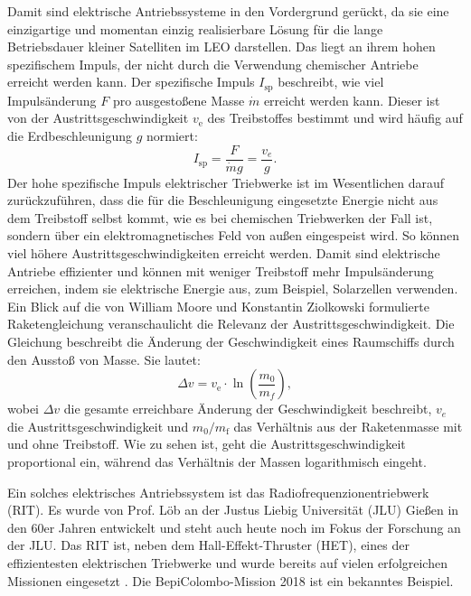 Damit sind elektrische Antriebssysteme in den Vordergrund gerückt, da sie eine einzigartige und momentan einzig realisierbare Lösung für die lange Betriebsdauer kleiner Satelliten im LEO darstellen. Das liegt an ihrem hohen spezifischem Impuls, der nicht durch die Verwendung chemischer Antriebe erreicht werden kann. Der spezifische Impuls $I_{\text{sp}}$ beschreibt, wie viel Impulsänderung $F$ pro ausgestoßene Masse $\dot{m}$ erreicht werden kann. Dieser ist von der Austrittsgeschwindigkeit $v_\text{e}$ des Treibstoffes bestimmt und wird häufig auf die Erdbeschleunigung $g$ normiert:
\begin{equation}
    I_{\text{sp}} = \frac{F}{\dot{m}g} = \frac{v_e}{g}.
\end{equation} 
Der hohe spezifische Impuls elektrischer Triebwerke ist im Wesentlichen darauf zurückzuführen, dass die für die Beschleunigung eingesetzte Energie nicht aus dem Treibstoff selbst kommt, wie es bei chemischen Triebwerken der Fall ist, sondern über ein elektromagnetisches Feld von außen eingespeist wird. So können viel höhere Austrittsgeschwindigkeiten erreicht werden. Damit sind elektrische Antriebe effizienter und können mit weniger Treibstoff mehr Impulsänderung erreichen, indem sie elektrische Energie aus, zum Beispiel, Solarzellen verwenden. Ein Blick auf die von William Moore und Konstantin Ziolkowski formulierte Raketengleichung veranschaulicht die Relevanz der Austrittsgeschwindigkeit. Die Gleichung beschreibt die Änderung der Geschwindigkeit eines Raumschiffs durch den Ausstoß von Masse. Sie lautet:
\begin{equation}
    \Delta v = v_{\text{e}} \cdot \ln\left(\frac{m_0}{m_f}\right),
\end{equation}
wobei $\Delta v$ die gesamte erreichbare Änderung der Geschwindigkeit beschreibt, $v_e$ die Austrittsgeschwindigkeit und $m_{\text{0}} / m_{\text{f}}$ das Verhältnis aus der Raketenmasse mit und ohne Treibstoff. Wie zu sehen ist, geht die Austrittsgeschwindigkeit proportional ein, während das Verhältnis der Massen logarithmisch eingeht. 

Ein solches elektrisches Antriebssystem ist das Radiofrequenzionentriebwerk (RIT). Es wurde von Prof. Löb an der Justus Liebig Universität (JLU) Gießen in den 60er Jahren entwickelt und steht auch heute noch im Fokus der Forschung an der JLU. Das RIT ist, neben dem Hall-Effekt-Thruster (HET), eines der effizientesten elektrischen Triebwerke und wurde bereits auf vielen erfolgreichen Missionen eingesetzt \cite[S. 6]{ion}. Die BepiColombo-Mission 2018 ist ein bekanntes Beispiel.

